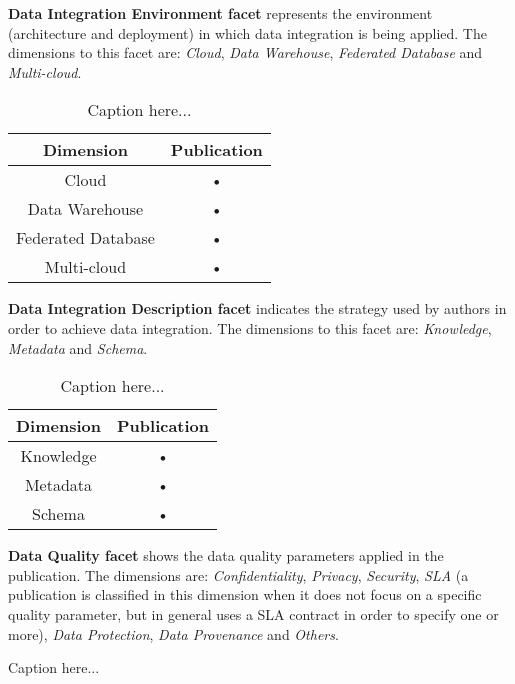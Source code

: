 \begin{description}
\item \textbf{Data Integration Environment facet} represents the environment (architecture and deployment) in which data integration is being applied. The dimensions to this facet are: \textit{Cloud}, \textit{Data Warehouse}, \textit{Federated Database} and \textit{Multi-cloud}.
\begin{table}[h]
\caption{Caption here...}
\begin{center}
\begin{tabular}{|c|c|}
\hline 
\textbf{Dimension} & \textbf{Publication} \\ 
\hline 
Cloud & • \\ 
\hline 
Data Warehouse & • \\ 
\hline 
Federated Database & • \\ 
\hline 
Multi-cloud & • \\ 
\hline 
\end{tabular}
\end{center}
\end{table}
\item \textbf{Data Integration Description facet} indicates the strategy used by authors in order to achieve data integration. The dimensions to this facet are: \textit{Knowledge}, \textit{Metadata} and \textit{Schema}.
\begin{table}[h]
\caption{Caption here...}
\begin{center}
\begin{tabular}{|c|c|}
\hline 
\textbf{Dimension} & \textbf{Publication} \\ 
\hline 
Knowledge & • \\ 
\hline 
Metadata & • \\ 
\hline 
Schema & • \\ 
\hline 
\end{tabular}
\end{center}
\end{table}
\item \textbf{Data Quality facet} shows the data quality parameters applied in the publication. The dimensions are: \textit{Confidentiality}, \textit{Privacy}, \textit{Security}, \textit{SLA} (a publication is classified in this dimension when it does not focus on a specific quality parameter, but in general uses a SLA contract in order to specify one or more), \textit{Data Protection}, \textit{Data Provenance} and \textit{Others}.
\begin{table}[h]
\caption{Caption here...}
\begin{center}

\end{center}
\end{table}
\end{description}

